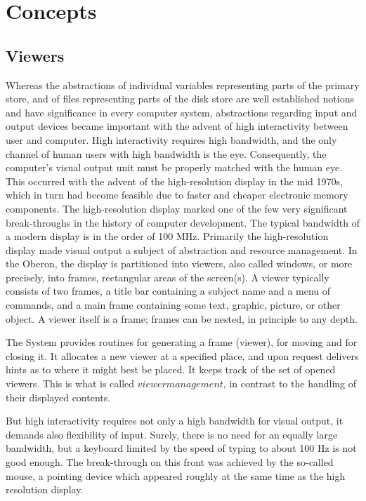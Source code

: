 \section{Concepts}
\subsection{Viewers}
Whereas the abstractions of individual variables representing parts of the primary store, and of files
representing parts of the disk store are well established notions and have significance in every
computer system, abstractions regarding input and output devices became important with the
advent of high interactivity between user and computer. High interactivity requires high bandwidth,
and the only channel of human users with high bandwidth is the eye. Consequently, the computer's
visual output unit must be properly matched with the human eye. This occurred with the advent of
the high-resolution display in the mid 1970s, which in turn had become feasible due to faster and
cheaper electronic memory components. The high-resolution display marked one of the few very
significant break-throughs in the history of computer development. The typical bandwidth of a
modern display is in the order of 100 MHz. Primarily the high-resolution display made visual output
a subject of abstraction and resource management. In the Oberon, the display is partitioned
into viewers, also called windows, or more precisely, into frames, rectangular areas of the
screen(s). A viewer typically consists of two frames, a title bar containing a subject name and a
menu of commands, and a main frame containing some text, graphic, picture, or other object. A
viewer itself is a frame; frames can be nested, in principle to any depth.

The System provides routines for generating a frame (viewer), for moving and for closing it. It
allocates a new viewer at a specified place, and upon request delivers hints as to where it might
best be placed. It keeps track of the set of opened viewers. This is what is called $viewer
management$, in contrast to the handling of their displayed contents.

But high interactivity requires not only a high bandwidth for visual output, it demands also flexibility
of input. Surely, there is no need for an equally large bandwidth, but a keyboard limited by the
speed of typing to about 100 Hz is not good enough. The break-through on this front was achieved
by the so-called mouse, a pointing device which appeared roughly at the same time as the high resolution display.

